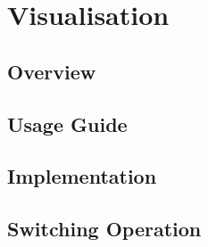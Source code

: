 \section{Visualisation}
\subsection{Overview}
\subsection{Usage Guide}
\subsection{Implementation}
\subsection{Switching Operation}